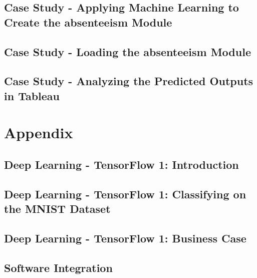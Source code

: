 \documentclass[12pt, a4paper]{article}
\begin{document}
\subsection{Case Study - Applying Machine Learning to Create the absenteeism Module}
\subsection{Case Study - Loading the absenteeism Module}
\subsection{Case Study - Analyzing the Predicted Outputs in Tableau}
\pagebreak
\appendix

\cleardoublepage

\section{Appendix}
\subsection{Deep Learning - TensorFlow 1: Introduction}
\subsection{Deep Learning - TensorFlow 1: Classifying on the MNIST Dataset}
\subsection{Deep Learning - TensorFlow 1: Business Case}
\subsection{Software Integration}
\end{document}
